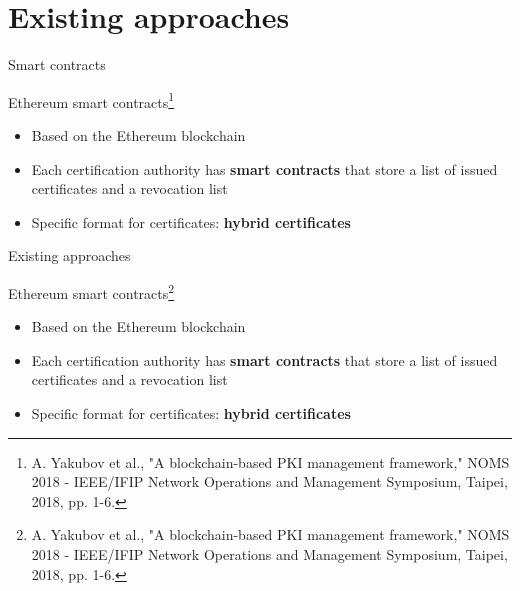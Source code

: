 \section[Possible solutions]{Existing approaches}



\begin{frame}{Smart contracts}

	\begin{exampleblock}{Ethereum smart contracts\footnote{A. Yakubov et al., "A blockchain-based PKI management framework," NOMS 2018 - IEEE/IFIP Network Operations and Management Symposium, Taipei, 2018, pp. 1-6.}}
		\begin{itemize}
			\item Based on the Ethereum blockchain
			\item Each certification authority has \textbf{smart contracts} that store a list of issued certificates and a revocation list
			\item Specific format for certificates: \textbf{hybrid certificates}
		\end{itemize}
	\end{exampleblock}

\end{frame}



\begin{frame}{Existing approaches}

	\begin{exampleblock}{Ethereum smart contracts\footnote{A. Yakubov et al., "A blockchain-based PKI management framework," NOMS 2018 - IEEE/IFIP Network Operations and Management Symposium, Taipei, 2018, pp. 1-6.}}
		\begin{itemize}
			\item Based on the Ethereum blockchain
			\item Each certification authority has \textbf{smart contracts} that store a list of issued certificates and a revocation list
			\item Specific format for certificates: \textbf{hybrid certificates}
		\end{itemize}
	\end{exampleblock}

\end{frame}

